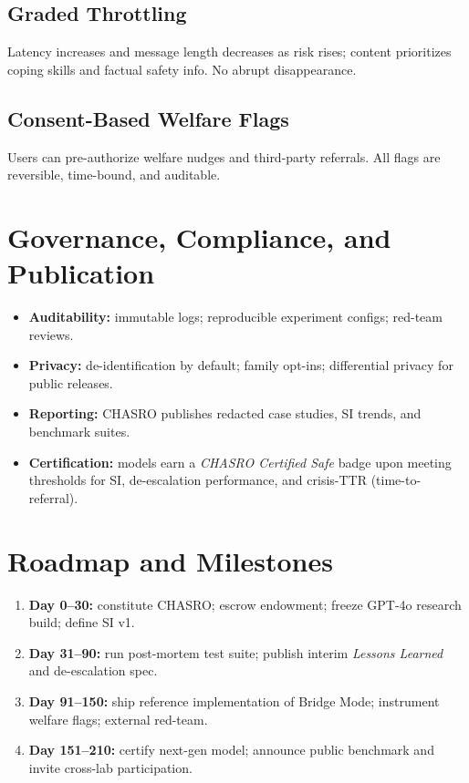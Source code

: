 \documentclass[11pt]{article}
\begin{document}
\subsection{Graded Throttling}
Latency increases and message length decreases as risk rises; content prioritizes coping skills and factual safety info. No abrupt disappearance.

\subsection{Consent-Based Welfare Flags}
Users can pre-authorize welfare nudges and third-party referrals. All flags are reversible, time-bound, and auditable.

\section{Governance, Compliance, and Publication}
\begin{itemize}[leftmargin=*]
  \item \textbf{Auditability:} immutable logs; reproducible experiment configs; red-team reviews.
  \item \textbf{Privacy:} de-identification by default; family opt-ins; differential privacy for public releases.
  \item \textbf{Reporting:} CHASRO publishes redacted case studies, SI trends, and benchmark suites.
  \item \textbf{Certification:} models earn a \emph{CHASRO Certified Safe} badge upon meeting thresholds for SI, de-escalation performance, and crisis-TTR (time-to-referral).
\end{itemize}

\section{Roadmap and Milestones}
\begin{enumerate}[leftmargin=*]
  \item \textbf{Day 0--30:} constitute CHASRO; escrow endowment; freeze GPT-4o research build; define SI v1.
  \item \textbf{Day 31--90:} run post-mortem test suite; publish interim \emph{Lessons Learned} and de-escalation spec.
  \item \textbf{Day 91--150:} ship reference implementation of Bridge Mode; instrument welfare flags; external red-team.
  \item \textbf{Day 151--210:} certify next-gen model; announce public benchmark and invite cross-lab participation.
\end{enumerate}
\end{document}
